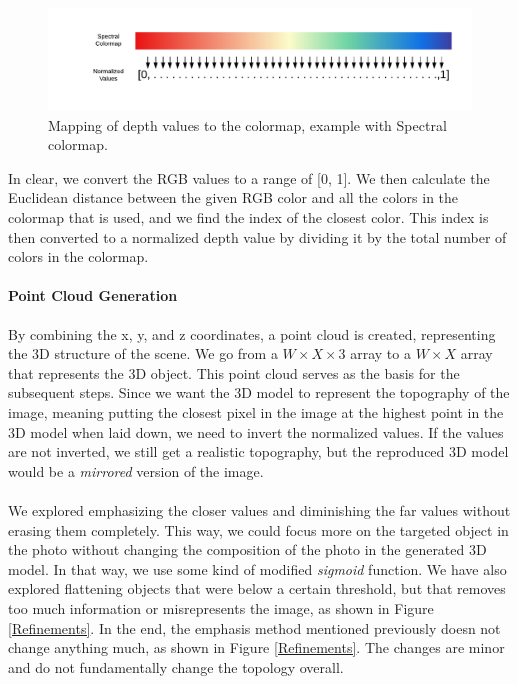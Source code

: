 \documentclass[12pt, letterpaper]{article}
\begin{document}
\begin{spacing}{1.15}
\begin{figure}[ht]
    \begin{center}
        \includegraphics[width=\textwidth]{Mapping.pdf}
        \caption{Mapping of depth values to the colormap, example with Spectral colormap.}
        \label{map}
    \end{center}
\end{figure}

In clear, we convert the RGB values to a range of [0, 1]. We then calculate the Euclidean distance between the given RGB color and all the colors in the colormap that is used, and we find
the index of the closest color. This index is then converted to a normalized depth value by dividing it by the total number of colors in the colormap.

\paragraph{Point Cloud Generation} By combining the x, y, and z coordinates, a point cloud is created, representing the 3D structure of the scene. We go from a \(W\times X\times 3\) array to
a \(W\times X\) array that represents the 3D object. This point cloud serves as the basis for the subsequent steps. Since we want the 3D model to represent the topography of the image, meaning
putting the closest pixel in the image at the highest point in the 3D model when laid down, we need to invert the normalized values. If the values are not inverted, we still get a realistic
topography, but the reproduced 3D model would be a \emph{mirrored} version of the image.

\paragraph{}
We explored emphasizing the closer values and diminishing the far values without erasing them completely. This way, we could focus more on the targeted object in the photo without changing the
composition of the photo in the generated 3D model. In that way, we use some kind of modified \emph{sigmoid} function. We have also explored flattening objects that were below a certain
threshold, but that removes too much information or misrepresents the image, as shown in Figure \ref{Refinements}.
In the end, the emphasis method mentioned previously doesn not change anything much, as shown in Figure \ref{Refinements}. The changes are minor and do not fundamentally change the topology overall.


\end{spacing}
\end{document}
